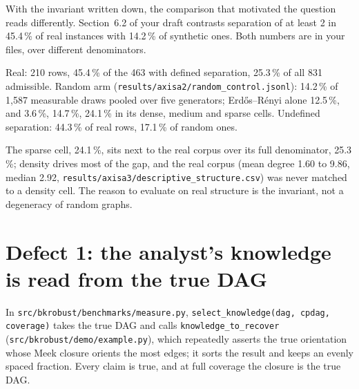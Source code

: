 With the invariant written down, the comparison that motivated the question reads differently. Section~6.2 of your draft
contrasts separation of at least 2 in 45.4\,\% of real instances with 14.2\,\% of synthetic ones. Both numbers are in your
files, over different denominators.

\begin{medido}
Real: 210 rows, 45.4\,\% of the 463 with defined separation, 25.3\,\% of all 831 admissible. Random arm (\texttt{results/axisa2/random\_control.jsonl}): 14.2\,\% of 1,587
measurable draws pooled over five generators; Erdős--Rényi alone 12.5\,\%, and 3.6\,\%, 14.7\,\%, 24.1\,\% in its dense,
medium and sparse cells. Undefined separation: 44.3\,\% of real rows, 17.1\,\% of random ones.
\end{medido}

The sparse cell, 24.1\,\%, sits next to the real corpus over its full denominator, 25.3\,\%; density drives most of the gap,
and the real corpus (mean degree 1.60 to 9.86, median 2.92, \texttt{results/axisa3/descriptive\_structure.csv}) was never
matched to a density cell. The reason to evaluate on real structure is the invariant, not a degeneracy of random graphs.


\begin{antes}
\end{antes}

\section{Defect 1: the analyst's knowledge is read from the true DAG}

In \texttt{src/bkrobust/benchmarks/measure.py}, \texttt{select\_knowledge(dag, cpdag, coverage)} takes the true DAG and calls
\texttt{knowledge\_to\_recover} (\texttt{src/bkrobust/demo/example.py}), which repeatedly asserts the true orientation whose
Meek closure orients the most edges; it sorts the result and keeps an evenly spaced fraction. Every claim is true, and at full
coverage the closure is the true DAG.

